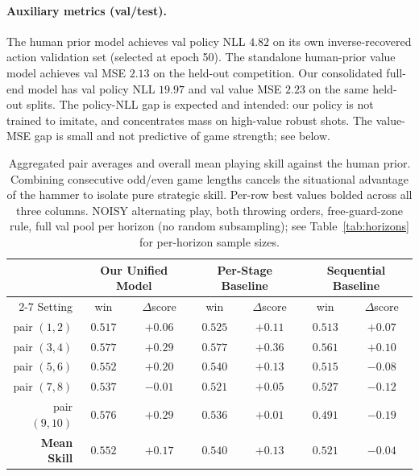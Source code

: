 \documentclass[11pt]{article}
\begin{document}
\paragraph{Auxiliary metrics (val/test).}
The human prior model achieves val policy NLL $4.82$ on its own
inverse-recovered action validation set (selected at epoch 50). The
standalone human-prior value model achieves val MSE $2.13$ on the held-out
competition. Our consolidated full-end model has val policy NLL $19.97$ and
val value MSE $2.23$ on the same held-out splits. The policy-NLL gap is
expected and intended: our policy is not trained to imitate, and concentrates
mass on high-value robust shots. The value-MSE gap is small and not
predictive of game strength; see below.



\begin{table}[ht]
\centering
\caption{Aggregated pair averages and overall mean playing skill against the
human prior. Combining consecutive odd/even game lengths cancels the
situational advantage of the hammer to isolate pure strategic skill. Per-row
best values bolded across all three columns. NOISY alternating play, both
throwing orders, free-guard-zone rule, full val pool per horizon (no random
subsampling); see Table~\ref{tab:horizons} for per-horizon sample sizes.}
\label{tab:averages}
\small
\setlength{\tabcolsep}{8pt}
\renewcommand{\arraystretch}{1.1}
\begin{tabular}{r cc | cc | cc}
\hline
 & \multicolumn{2}{c|}{\textbf{Our Unified Model}} & \multicolumn{2}{c|}{\textbf{Per-Stage Baseline}} & \multicolumn{2}{c}{\textbf{Sequential Baseline}} \\
 \cline{2-7}
Setting & win & $\Delta$score & win & $\Delta$score & win & $\Delta$score \\
\hline
pair $(1,2)$  & $0.517$           & $+0.06$           & $\mathbf{0.525}$  & $\mathbf{+0.11}$  & $0.513$           & $+0.07$           \\
pair $(3,4)$  & $\mathbf{0.577}$  & $+0.29$           & $\mathbf{0.577}$  & $\mathbf{+0.36}$  & $0.561$           & $+0.10$           \\
pair $(5,6)$  & $\mathbf{0.552}$  & $\mathbf{+0.20}$  & $0.540$           & $+0.13$           & $0.515$           & $-0.08$           \\
pair $(7,8)$  & $\mathbf{0.537}$  & $-0.01$           & $0.521$           & $\mathbf{+0.05}$  & $0.527$           & $-0.12$           \\
pair $(9,10)$ & $\mathbf{0.576}$  & $\mathbf{+0.29}$  & $0.536$           & $+0.01$           & $0.491$           & $-0.19$           \\
\hline
\textbf{Mean Skill} & $\mathbf{0.552}$  & $\mathbf{+0.17}$  & $0.540$  & $+0.13$  & $0.521$  & $-0.04$ \\
\hline
\end{tabular}
\end{table}
\end{document}
